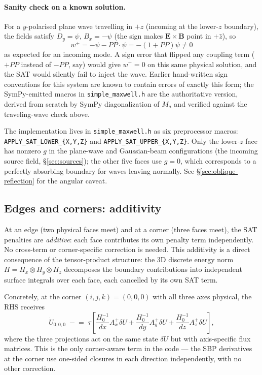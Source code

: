 \documentclass[11pt]{article}
\newcommand{\vE}{\mathbf{E}}
\newcommand{\vB}{\mathbf{B}}
\newcommand{\hz}{\hat{z}}
\begin{document}
\paragraph{Sanity check on a known solution.}
For a $y$-polarised plane wave travelling in $+z$ (incoming at the
lower-$z$ boundary), the fields satisfy
$D_y = \psi$, $B_x = -\psi$ (the sign makes $\vE \times \vB$ point
in $+\hz$), so
\[
  w^+ = -\psi - PP\cdot\psi = -(1+PP)\psi \neq 0
\]
as expected for an incoming mode.  A sign error that flipped any
coupling term ($+PP$ instead of $-PP$, say) would give $w^+ = 0$
on this same physical solution, and the SAT would silently fail to
inject the wave.  Earlier hand-written sign conventions for this
system are known to contain errors of exactly this form; the
SymPy-emitted macros in \texttt{simple\_maxwell.h} are the
authoritative version, derived from scratch by SymPy
diagonalization of $M_a$ and verified against the traveling-wave
check above.

The implementation lives in \texttt{simple\_maxwell.h} as six
preprocessor macros: \texttt{APPLY\_SAT\_LOWER\_\{X,Y,Z\}} and
\texttt{APPLY\_SAT\_UPPER\_\{X,Y,Z\}}.  Only the lower-$z$ face
has nonzero $g$ in the plane-wave and Gaussian-beam configurations
(the incoming source field, \S\ref{sec:sources}); the other five
faces use $g = 0$, which corresponds to a perfectly absorbing
boundary for waves leaving normally.  See
\S\ref{sec:oblique-reflection} for the angular caveat.

\subsection{Edges and corners: additivity}

At an edge (two physical faces meet) and at a corner (three faces
meet), the SAT penalties are \emph{additive}: each face
contributes its own penalty term independently.  No cross-term or
corner-specific correction is needed.  This additivity is a direct
consequence of the tensor-product structure: the 3D discrete
energy norm $H = H_x \otimes H_y \otimes H_z$ decomposes the
boundary contributions into independent surface integrals over
each face, each cancelled by its own SAT term.

Concretely, at the corner $(i,j,k) = (0,0,0)$ with all three axes
physical, the RHS receives
\begin{equation}
  \dot U_{0,0,0} \;\mathrel{-}=\; \tau \left[
    \frac{H^{-1}_0}{dx} A_x^+ \delta U
  + \frac{H^{-1}_0}{dy} A_y^+ \delta U
  + \frac{H^{-1}_0}{dz} A_z^+ \delta U
  \right],
  \label{eq:corner-sat}
\end{equation}
where the three projections act on the same state $\delta U$ but
with axis-specific flux matrices.  This is the only corner-aware
term in the code --- the SBP derivatives at the corner use
one-sided closures in each direction independently, with no other
correction.
\end{document}
